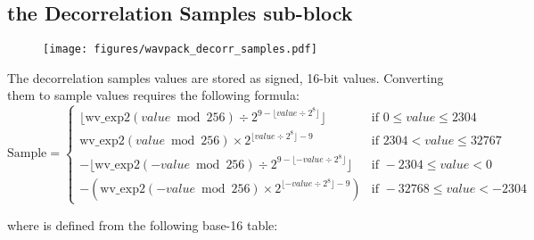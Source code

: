 \subsection{the Decorrelation Samples sub-block}
\begin{figure}[h]
\texttt{[image: figures/wavpack\_decorr\_samples.pdf]}
\end{figure}
\par
\noindent
The decorrelation samples values are stored as signed, 16-bit values.
Converting them to sample values requires the following formula:
\begin{equation*}
\text{Sample} =
\begin{cases}
\lfloor \text{wv\_exp2}(value \bmod{256}) \div 2 ^ {9 - \lfloor value \div 2 ^ 8 \rfloor} \rfloor & \text{if } 0 \leq value \leq 2304 \\
\text{wv\_exp2}(value \bmod{256}) \times 2 ^ {\lfloor value \div 2 ^ 8 \rfloor - 9} & \text{if } 2304 < value \leq 32767 \\
-\lfloor \text{wv\_exp2}(-value \bmod{256}) \div 2 ^ {9 - \lfloor -value \div 2 ^ 8 \rfloor} \rfloor & \text{if } -2304 \leq value < 0 \\
-(\text{wv\_exp2}(-value \bmod{256}) \times 2 ^ {\lfloor -value \div 2 ^ 8 \rfloor - 9}) & \text{if } -32768 \leq value < -2304
\end{cases}
\end{equation*}
\par
\noindent
where  is defined from the following base-16 table:
\par
\noindent
